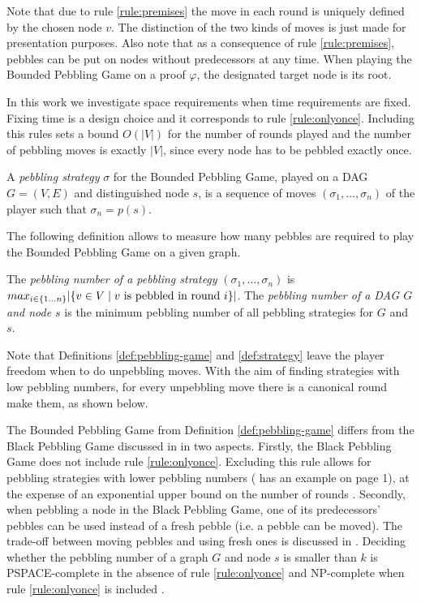 Note that due to rule \ref{rule:premises} the move in each round is uniquely defined by the chosen node $v$.
The distinction of the two kinds of moves is just made for presentation purposes.
Also note that as a consequence of rule \ref{rule:premises}, pebbles can be put on nodes without predecessors at any time.
When playing the Bounded Pebbling Game on a proof $\varphi$, the designated target node is its root.

In this work we investigate space requirements when time requirements are fixed.
Fixing time is a design choice and it corresponds to rule \ref{rule:onlyonce}.
Including this rules sets a bound $O(|V|)$ for the number of rounds played and the number of pebbling moves is exactly $|V|$, since every node has to be pebbled exactly once.

\begin{definition}[Strategy]
\label{def:strategy}
A \emph{pebbling strategy} $\sigma$ for the Bounded Pebbling Game, played on a DAG $G = (V,E)$ and distinguished node $s$, is a sequence of moves $(\sigma_1,\ldots,\sigma_n)$ of the player such that $\sigma_n = p(s)$.
\end{definition}

The following definition allows to measure how many pebbles are required to play the Bounded Pebbling Game on a given graph.

\begin{definition}
The \emph{pebbling number of a pebbling strategy} $(\sigma_1,\ldots,\sigma_n)$ is 
$ max_{i \scriptstyle \in \{1\ldots n\} \displaystyle}|\{ v \in V \mid v \text{ is pebbled in round } i\}| $.
The \emph{pebbling number of a DAG $G$ and node $s$} is the minimum pebbling number of all pebbling strategies for $G$ and $s$.
\end{definition}

Note that Definitions \ref{def:pebbling-game} and \ref{def:strategy} leave the player freedom when to do unpebbling moves.
With the aim of finding strategies with low pebbling numbers, for every unpebbling move there is a canonical round make them, as shown below.

The Bounded Pebbling Game from Definition \ref{def:pebbling-game} differs from the Black Pebbling Game discussed in \cite{Hertel2007,Pippenger1982} in two aspects. 
Firstly, the Black Pebbling Game does not include rule \ref{rule:onlyonce}. 
Excluding this rule allows for pebbling strategies with lower pebbling numbers (\cite{Sethi1975} has an example on page 1), at the expense of an exponential upper bound on the number of rounds \cite{EmdeBoas1979}.
Secondly, when pebbling a node in the Black Pebbling Game, one of its predecessors' pebbles can be used instead of a fresh pebble (i.e. a pebble can be moved). 
The trade-off between moving pebbles and using fresh ones is discussed in \cite{EmdeBoas1979}. 
Deciding whether the pebbling number of a graph $G$ and node $s$ is smaller than $k$ is PSPACE-complete in the absence of rule \ref{rule:onlyonce} \cite{Gilbert1980} and NP-complete when rule \ref{rule:onlyonce} is included \cite{Sethi1975}.

